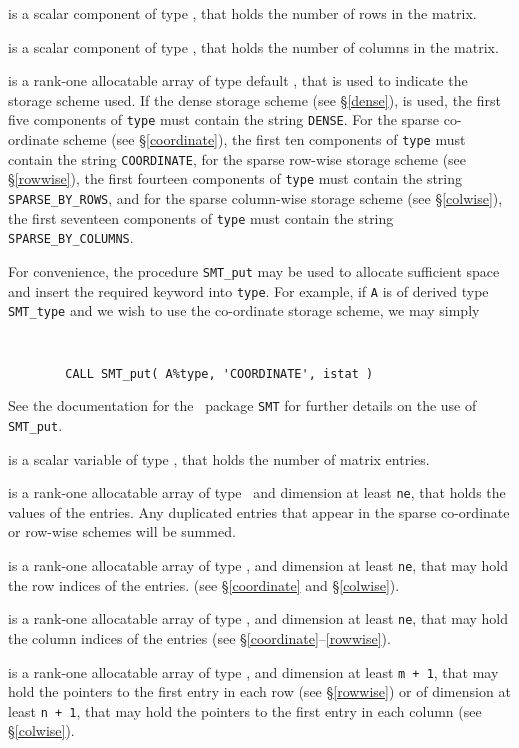 \documentclass{galahad}
\begin{document}
\begin{description}

 is a scalar component of type \integer, 
that holds the number of rows in the matrix. 
 
 is a scalar component of type \integer, 
that holds the number of columns in the matrix. 
 
 is a rank-one allocatable array of type default \character, that
is used to indicate the storage scheme used. If the dense storage scheme 
(see \S\ref{dense}), is used, 
the first five components of {\tt type} must contain the
string {\tt DENSE}.
For the sparse co-ordinate scheme (see \S\ref{coordinate}), 
the first ten components of {\tt type} must contain the
string {\tt COORDINATE}, 
for the sparse row-wise storage scheme (see \S\ref{rowwise}),
the first fourteen components of {\tt type} must contain the
string {\tt SPARSE\_BY\_ROWS}, and
for the sparse column-wise storage scheme (see \S\ref{colwise}),
the first seventeen components of {\tt type} must contain the
string {\tt SPARSE\_BY\_COLUMNS}.

For convenience, the procedure {\tt SMT\_put} 
may be used to allocate sufficient space and insert the required keyword
into {\tt type}.
For example, if {\tt A} is of derived type {\tt SMT\_type}
and we wish to use the co-ordinate storage scheme, we may simply
{\tt 
\begin{verbatim}
        CALL SMT_put( A%type, 'COORDINATE', istat )
\end{verbatim}
}
\noindent
See the documentation for the \galahad\ package {\tt SMT} 
for further details on the use of {\tt SMT\_put}.

 is a scalar variable of type \integer, that
holds the number of matrix entries.

 is a rank-one allocatable array of type \realdp\, 
and dimension at least {\tt ne}, that holds the values of the entries. 
Any duplicated entries that appear in the sparse 
co-ordinate or row-wise schemes will be summed. 

 is a rank-one allocatable array of type \integer, 
and dimension at least {\tt ne}, that may hold the row indices of the entries. 
(see \S\ref{coordinate} and \S\ref{colwise}).

 is a rank-one allocatable array of type \integer, 
and dimension at least {\tt ne}, that may hold the column indices of the entries
(see \S\ref{coordinate}--\ref{rowwise}).

 is a rank-one allocatable array of type \integer, 
and dimension at least {\tt m + 1}, that may hold the pointers to
the first entry in each row (see \S\ref{rowwise}) or of dimension
at least {\tt n + 1}, that may hold the pointers to
the first entry in each column (see \S\ref{colwise}).

\end{description}
\end{document}
